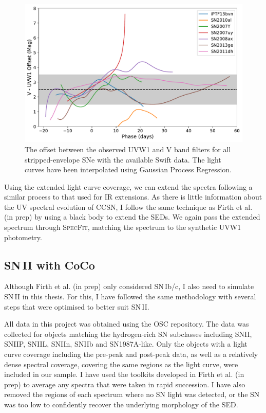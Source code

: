 \begin{figure}
  \centering
  \includegraphics[width=\textwidth]{Figures/Chapter3/VOffset_Ibc}
  \caption{The offset between the observed UVW1 and V band filters for all stripped-envelope SNe with the available Swift data. The light curves have been interpolated using Gaussian Process Regression.}
  \label{fig:VvsUVW1}
\end{figure}

Using the extended light curve coverage, we can extend the spectra following a similar process to that used for IR extensions. As there is little information about the UV spectral evolution of CCSN, I follow the same technique as Firth et al. (in prep) by using a black body to extend the SEDs. We again pass the extended spectrum through \textsc{SpecFit}, matching the spectrum to the synthetic UVW1 photometry.

\subsection{SN\,II with CoCo}
Although Firth et al. (in prep) only considered SN\,Ib/c, I also need to simulate SN\,II in this thesis. For this, I have followed the same methodology with several steps that were optimised to better suit SN\,II.

All data in this project was obtained using the OSC repository. The data was collected for objects matching the hydrogen-rich SN subclasses including SNII, SNIIP, SNIIL, SNIIn, SNIIb and SN1987A-like. Only the objects with a light curve coverage including the pre-peak and post-peak data, as well as a relatively dense spectral coverage, covering the same regions as the light curve, were included in our sample. I have used the toolkits developed in Firth et al. (in prep) to average any spectra that were taken in rapid succession. I have also removed the regions of each spectrum where no SN light was detected, or the S\/N was too low to confidently recover the underlying morphology of the SED.


